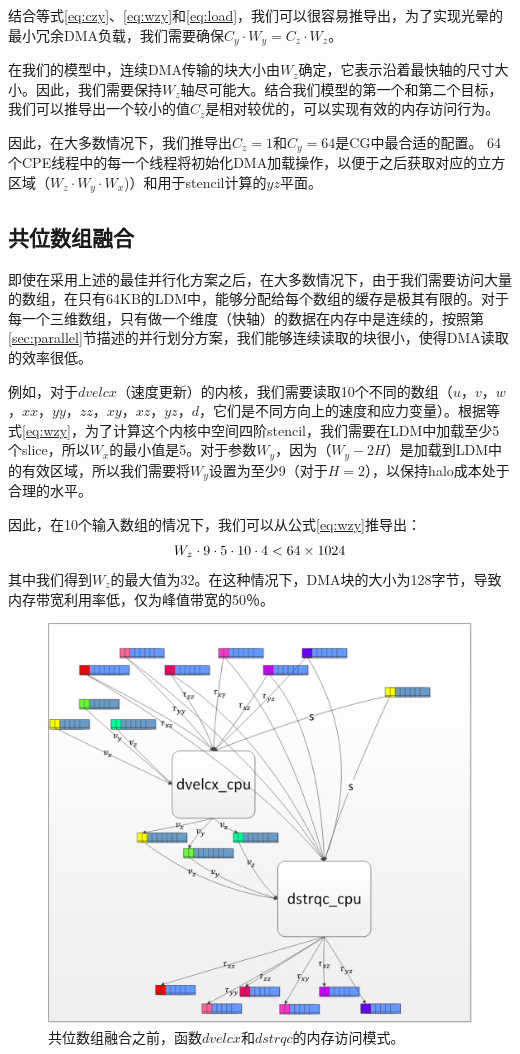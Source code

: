 \documentclass[degree=doctor]{thuthesis}
\begin{document}
结合等式\ref{eq:czy}、\ref{eq:wzy}和\ref{eq:load}，我们可以很容易推导出，为了实现光晕的最小冗余DMA负载，我们需要确保$C_y\cdot W_y = C_z\cdot W_z $。



在我们的模型中，连续DMA传输的块大小由$ W_z $确定，它表示沿着最快轴的尺寸大小。因此，我们需要保持$ W_z $轴尽可能大。结合我们模型的第一个和第二个目标，我们可以推导出一个较小的值$ C_z $是相对较优的，可以实现有效的内存访问行为。

因此，在大多数情况下，我们推导出$ C_z = 1 $和$ C_y = 64 $是CG中最合适的配置。 64个CPE线程中的每一个线程将初始化DMA加载操作，以便于之后获取对应的立方区域（$W_z \cdot W_y \cdot W_x$)）和用于stencil计算的$ yz $平面。

\subsection{共位数组融合}
即使在采用上述的最佳并行化方案之后，在大多数情况下，由于我们需要访问大量的数组，在只有64KB的LDM中，能够分配给每个数组的缓存是极其有限的。对于每一个三维数组，只有做一个维度（快轴）的数据在内存中是连续的，按照第\ref{sec:parallel}节描述的并行划分方案，我们能够连续读取的块很小，使得DMA读取的效率很低。

例如，对于$ dvelcx $（速度更新）的内核，我们需要读取10个不同的数组（$ u $，$ v $，$ w $，$ xx $，$ yy $，$ zz $，$ xy $，$ xz $，$ yz $，$ d $，它们是不同方向上的速度和应力变量）。根据等式\ref {eq:wzy}，为了计算这个内核中空间四阶stencil，我们需要在LDM中加载至少5个slice，所以$ W_x $的最小值是5。对于参数$ W_y $，因为$（W_y-2H）$是加载到LDM中的有效区域，所以我们需要将$ W_y $设置为至少9（对于$ H = 2 $），以保持halo成本处于合理的水平。

因此，在10个输入数组的情况下，我们可以从公式\ref{eq:wzy}推导出：
\begin{equation}
W_z \cdot 9 \cdot 5 \cdot 10 \cdot 4 < 64 \times 1024\\
\label{eq:wzy1}
\end{equation}
其中我们得到$ W_z $的最大值为32。在这种情况下，DMA块的大小为128字节，导致内存带宽利用率低，仅为峰值带宽的50％。
\begin{figure}[h]
\centering
\includegraphics[width=0.7\columnwidth]{awp_before.png}
\caption{共位数组融合之前，函数$dvelcx$和$dstrqc$的内存访问模式。}
\label{fig:array-fusion-before}
\end{figure}
\end{document}
